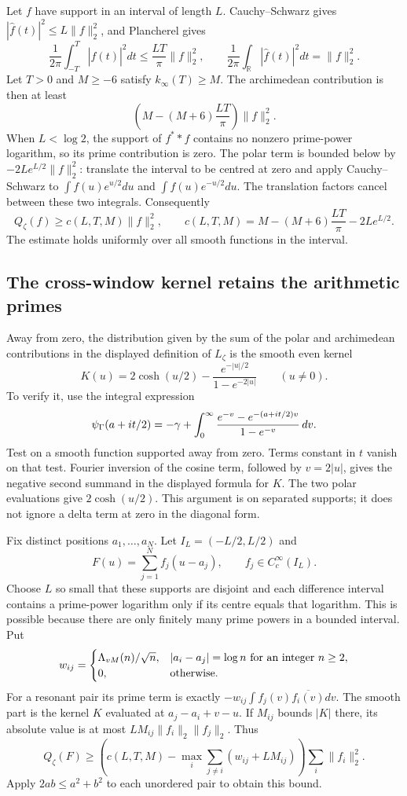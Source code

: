 Let $f$ have support in an interval of length $L$. Cauchy--Schwarz gives $|\widehat f(t)|^2\le L\|f\|_2^2$, and Plancherel gives
\[
 \frac1{2\pi}\int_{-T}^T|\widehat f(t)|^2dt
       \le\frac{LT}{\pi}\|f\|_2^2,\qquad
 \frac1{2\pi}\int_\mathbb R|\widehat f(t)|^2dt=\|f\|_2^2.
\]
Let $T>0$ and $M\ge-6$ satisfy $k_\infty(T)\ge M$.
The archimedean contribution is then at least
\[
 \left(M-(M+6)\frac{LT}{\pi}\right)\|f\|_2^2.
\]
When $L<\log2$, the support of $f^**f$ contains no nonzero prime-power logarithm, so its prime contribution is zero. The polar term is bounded below by $-2Le^{L/2}\|f\|_2^2$: translate the interval to be centred at zero and apply Cauchy--Schwarz to $\int f(u)e^{u/2}du$ and $\int f(u)e^{-u/2}du$. The translation factors cancel between these two integrals. Consequently
\[
 Q_\zeta(f)\ge c(L,T,M)\|f\|_2^2,
 \qquad c(L,T,M)=M-(M+6)\frac{LT}{\pi}-2Le^{L/2}.
\]
The estimate holds uniformly over all smooth functions in the interval.

\subsection{The cross-window kernel retains the arithmetic primes}
Away from zero, the distribution given by the sum of the polar and archimedean contributions in the displayed definition of $L_\zeta$ is the smooth even kernel
\[
 K(u)=2\cosh(u/2)-\frac{e^{-|u|/2}}{1-e^{-2|u|}}\qquad(u\ne0).
\]
To verify it, use the integral expression
\[
 \psi_{\Gamma}(a+it/2)=-\gamma+
 \int_0^\infty\frac{e^{-v}-e^{-(a+it/2)v}}{1-e^{-v}}\,dv.
\]
Test on a smooth function supported away from zero. Terms constant in $t$ vanish on that test. Fourier inversion of the cosine term, followed by $v=2|u|$, gives the negative second summand in the displayed formula for $K$. The two polar evaluations give $2\cosh(u/2)$. This argument is on separated supports; it does not ignore a delta term at zero in the diagonal form.

Fix distinct positions $a_1,\ldots,a_N$. Let $I_L=(-L/2,L/2)$ and
\[
 F(u)=\sum_{j=1}^N f_j(u-a_j),\qquad f_j\in C_c^\infty(I_L).
\]
Choose $L$ so small that these supports are disjoint and each difference interval contains a prime-power logarithm only if its centre equals that logarithm. This is possible because there are only finitely many prime powers in a bounded interval. Put
\[
 w_{ij}=\begin{cases}
 \Lambda_{vM}(n)/\sqrt n,&|a_i-a_j|=\log n\text{ for an integer }n\ge2,\\
 0,&\text{otherwise}.
 \end{cases}
\]
For a resonant pair its prime term is exactly $-w_{ij}\int f_j(v)\overline{f_i(v)}dv$. The smooth part is the kernel $K$ evaluated at $a_j-a_i+v-u$. If $M_{ij}$ bounds $|K|$ there, its absolute value is at most $LM_{ij}\|f_i\|_2\|f_j\|_2$. Thus
\[
 Q_\zeta(F)\ge
 \left(c(L,T,M)-\max_i\sum_{j\ne i}(w_{ij}+LM_{ij})\right)
       \sum_i\|f_i\|_2^2.
\]
Apply $2ab\le a^2+b^2$ to each unordered pair to obtain this bound.

